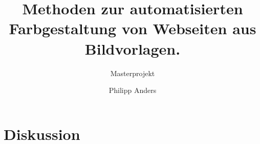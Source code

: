 \documentclass[11pt, bibliography=totoc]{scrartcl}
\begin{document}
\title{Methoden zur automatisierten Farbgestaltung von Webseiten aus Bildvorlagen.}
\subtitle{Masterprojekt}
\author{Philipp Anders}

\maketitle

\begin{abstract}
\end{abstract}

\pagebreak
\tableofcontents
\pagebreak












\section{Diskussion}


\footnotesize{}
\end{document}
